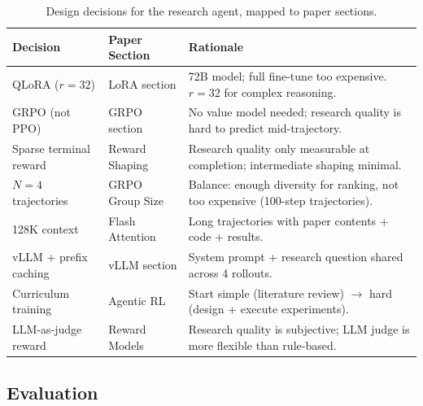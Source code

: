 \begin{table}[ht!]
\centering
\caption{Design decisions for the research agent, mapped to paper sections.}
\begin{tabular}{@{}lp{5cm}p{8cm}@{}}
\toprule
\textbf{Decision} & \textbf{Paper Section} & \textbf{Rationale} \\
\midrule
QLoRA ($r=32$) & LoRA section & 72B model; full fine-tune too expensive. $r=32$ for complex reasoning. \\
GRPO (not PPO) & GRPO section & No value model needed; research quality is hard to predict mid-trajectory. \\
Sparse terminal reward & Reward Shaping & Research quality only measurable at completion; intermediate shaping minimal. \\
$N=4$ trajectories & GRPO Group Size & Balance: enough diversity for ranking, not too expensive (100-step trajectories). \\
128K context & Flash Attention & Long trajectories with paper contents + code + results. \\
vLLM + prefix caching & vLLM section & System prompt + research question shared across 4 rollouts. \\
Curriculum training & Agentic RL & Start simple (literature review) $\to$ hard (design + execute experiments). \\
LLM-as-judge reward & Reward Models & Research quality is subjective; LLM judge is more flexible than rule-based. \\
\bottomrule
\end{tabular}
\end{table}

\subsection{Evaluation}
\label{evaluation}

